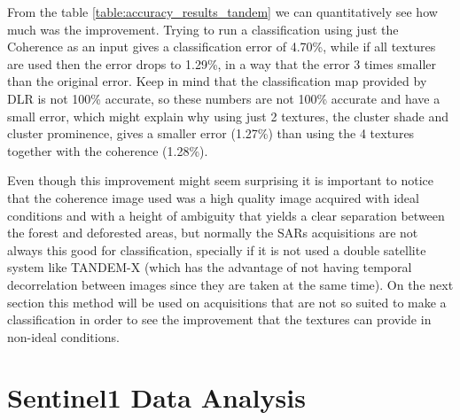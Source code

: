 From the table \ref{table:accuracy_results_tandem} we can quantitatively see how much was the improvement. Trying to run a classification using just the Coherence as an input gives a classification error of 4.70\%, while if all textures are used then the error drops to 1.29\%, in a way that the error 3 times smaller than the original error. Keep in mind that the classification map provided by DLR is not 100\% accurate, so these numbers are not 100\% accurate and have a small error, which might explain why using just 2 textures, the cluster shade and cluster prominence, gives a smaller error (1.27\%) than using the 4 textures together with the coherence (1.28\%).

Even though this improvement might seem surprising it is important to notice that the coherence image used was a high quality image acquired with ideal conditions and with a height of ambiguity that yields a clear separation between the forest and deforested areas, but normally the SARs acquisitions are not always this good for classification, specially if it is not used a double satellite system like TANDEM-X (which has the advantage of not having temporal decorrelation between images since they are taken at the same time).
On the next section this method will be used on acquisitions that are not so suited to make a classification in order to see the improvement that the textures can provide in non-ideal conditions.

\section{Sentinel1 Data Analysis}

